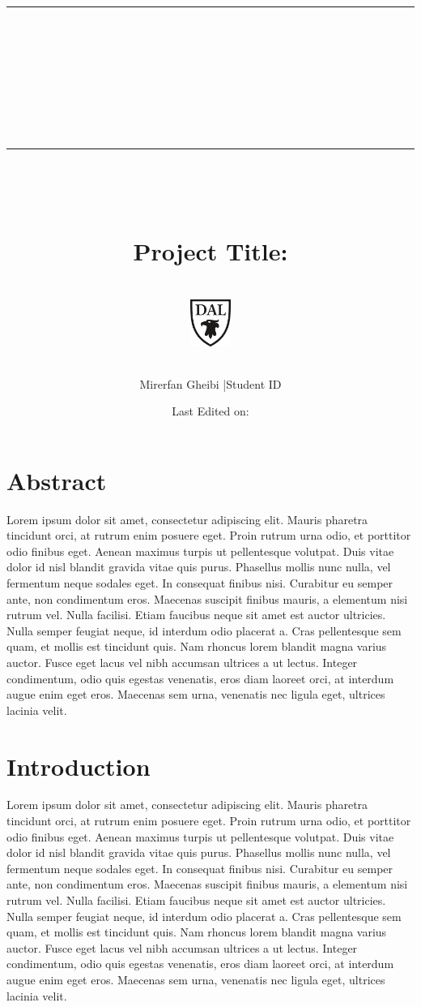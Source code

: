 \documentclass[11pt,titlepage]{article}
\title{\normalsize\rule{\textwidth}{0.1cm}\\ [0.5cm]
		\LARGE \textbf{\course}\\\reportname
		\\[0.5cm]\rule{\textwidth}{0.1cm}~\\[0.5cm]
		~
		\\\textbf{Project Title: }
		\\\prtitle
		\\ [0.5cm]
		\normalsize \vspace*{5\baselineskip}
		\includegraphics[width=0.1\textwidth]{graphics/institute_logo.png}\\[1cm]
		\author{Mirerfan Gheibi |Student ID}
		\date{Last Edited on: \laseditdate}
		}
\begin{document}
\maketitle
\newpage

\section*{Abstract}
Lorem ipsum dolor sit amet, consectetur adipiscing elit. Mauris pharetra tincidunt orci, at rutrum enim posuere eget. Proin rutrum urna odio, et porttitor odio finibus eget. Aenean maximus turpis ut pellentesque volutpat. Duis vitae dolor id nisl blandit gravida vitae quis purus. Phasellus mollis nunc nulla, vel fermentum neque sodales eget. In consequat finibus nisi. Curabitur eu semper ante, non condimentum eros. Maecenas suscipit finibus mauris, a elementum nisi rutrum vel. Nulla facilisi. Etiam faucibus neque sit amet est auctor ultricies. Nulla semper feugiat neque, id interdum odio placerat a. Cras pellentesque sem quam, et mollis est tincidunt quis. Nam rhoncus lorem blandit magna varius auctor. Fusce eget lacus vel nibh accumsan ultrices a ut lectus. Integer condimentum, odio quis egestas venenatis, eros diam laoreet orci, at interdum augue enim eget eros. Maecenas sem urna, venenatis nec ligula eget, ultrices lacinia velit.

\section{Introduction}
Lorem ipsum dolor sit amet, consectetur adipiscing elit. Mauris pharetra tincidunt orci, at rutrum enim posuere eget. Proin rutrum urna odio, et porttitor odio finibus eget. Aenean maximus turpis ut pellentesque volutpat. Duis vitae dolor id nisl blandit gravida vitae quis purus. Phasellus mollis nunc nulla, vel fermentum neque sodales eget. In consequat finibus nisi. Curabitur eu semper ante, non condimentum eros. Maecenas suscipit finibus mauris, a elementum nisi rutrum vel. Nulla facilisi. Etiam faucibus neque sit amet est auctor ultricies. Nulla semper feugiat neque, id interdum odio placerat a. Cras pellentesque sem quam, et mollis est tincidunt quis. Nam rhoncus lorem blandit magna varius auctor. Fusce eget lacus vel nibh accumsan ultrices a ut lectus. Integer condimentum, odio quis egestas venenatis, eros diam laoreet orci, at interdum augue enim eget eros. Maecenas sem urna, venenatis nec ligula eget, ultrices lacinia velit.

 

\end{document}
